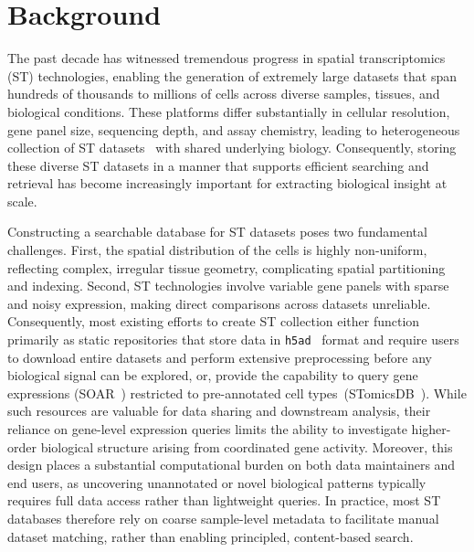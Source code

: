 \documentclass[pdflatex,sn-mathphys-num]{sn-jnl}%
\theoremstyle{thmstyleone}%
\theoremstyle{thmstyletwo}%
\theoremstyle{thmstylethree}%
\begin{document}
\section{Background}\label{sec1}

The past decade has witnessed tremendous progress in spatial transcriptomics (ST) technologies, enabling the generation of extremely large datasets that span hundreds of thousands to millions of cells across diverse samples, tissues, and biological conditions. These platforms differ substantially in cellular resolution, gene panel size, sequencing depth, and assay chemistry, leading to heterogeneous collection of ST datasets~\cite{moses2022museum} with shared underlying biology. Consequently, storing these diverse ST datasets in a manner that supports efficient searching and retrieval has become increasingly important for extracting biological insight at scale.

Constructing a searchable database for ST datasets poses two fundamental challenges. First, the spatial distribution of the cells is highly non-uniform, reflecting complex, irregular tissue geometry, complicating spatial partitioning and indexing. Second, ST technologies involve variable gene panels with sparse and noisy expression, making direct comparisons across datasets unreliable. Consequently, most existing efforts to create ST collection either function primarily as static repositories that store data in \texttt{h5ad}~\cite{fan2020spatialdb} format and require users to download entire datasets and perform extensive preprocessing before any biological signal can be explored, or, provide the capability to query gene expressions (SOAR~\cite{li2022soar}) restricted to pre-annotated cell types~(STomicsDB~\cite{xu2024stomicsdb}). While such resources are valuable for data sharing and downstream analysis, their reliance on gene-level expression queries limits the ability to investigate higher-order biological structure arising from coordinated gene activity. Moreover, this design places a substantial computational burden on both data maintainers and end users, as uncovering unannotated or novel biological patterns typically requires full data access rather than lightweight queries. In practice, most ST databases therefore rely on coarse sample-level metadata to facilitate manual dataset matching, rather than enabling principled, content-based search.
\end{document}
